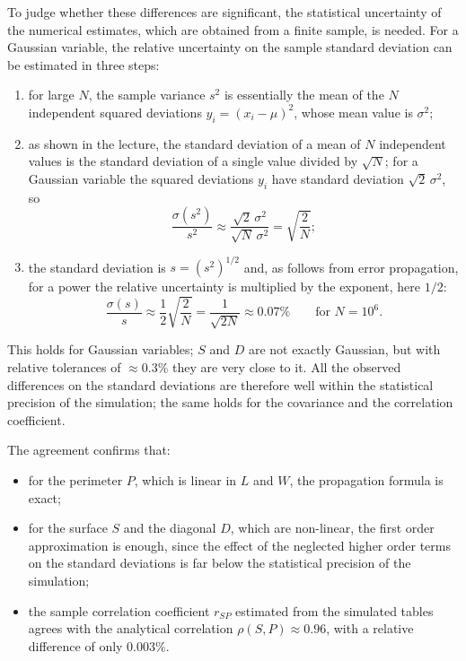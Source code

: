 \documentclass[11pt,a4paper]{article}
\begin{document}
	To judge whether these differences are significant, the statistical uncertainty of the numerical estimates, which are obtained from a finite sample, is needed.
	For a Gaussian variable, the relative uncertainty on the sample standard deviation can be estimated in three steps:
	\begin{enumerate}
		\item for large $N$, the sample variance $s^2$ is essentially the mean of the $N$ independent squared deviations $y_i = (x_i - \mu)^2$, whose mean value is $\sigma^2$;
		\item as shown in the lecture, the standard deviation of a mean of $N$ independent values is the standard deviation of a single value divided by $\sqrt{N}$; for a Gaussian variable the squared deviations $y_i$ have standard deviation $\sqrt{2}\,\sigma^2$, so
		\begin{equation}
			\frac{\sigma(s^2)}{s^2} \approx \frac{\sqrt{2}\,\sigma^2}{\sqrt{N}\,\sigma^2} = \sqrt{\frac{2}{N}} ;
		\end{equation}
		\item the standard deviation is $s = (s^2)^{1/2}$ and, as follows from error propagation, for a power the relative uncertainty is multiplied by the exponent, here $1/2$:
		\begin{equation}
			\frac{\sigma(s)}{s} \approx \frac{1}{2}\sqrt{\frac{2}{N}} = \frac{1}{\sqrt{2N}} \approx 0.07\% \qquad \text{for } N = 10^6 .
		\end{equation}
	\end{enumerate}
	This holds for Gaussian variables; $S$ and $D$ are not exactly Gaussian, but with relative tolerances of $\approx 0.3\%$ they are very close to it.
	All the observed differences on the standard deviations are therefore well within the statistical precision of the simulation; the same holds for the covariance and the correlation coefficient.
	
	The agreement confirms that:
	\begin{itemize}
		\item for the perimeter $P$, which is linear in $L$ and $W$, the propagation formula is exact;
		\item for the surface $S$ and the diagonal $D$, which are non-linear, the first order approximation is enough, since the effect of the neglected higher order terms on the standard deviations is far below the statistical precision of the simulation;
		\item the sample correlation coefficient $r_{SP}$ estimated from the simulated tables agrees with the analytical correlation $\rho(S, P) \approx 0.96$, with a relative difference of only $0.003\%$.
	\end{itemize}
	
\end{document}
